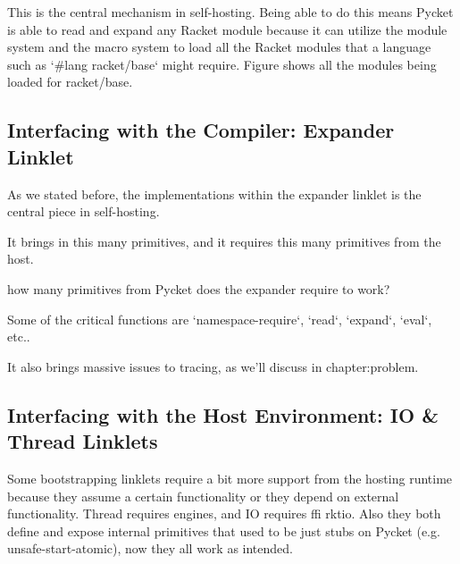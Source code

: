 
		\begin{paragraph-here}%
			This is the central mechanism in self-hosting. Being able to do this means Pycket is able to read and expand any Racket module because it can utilize the module system and the macro system to load all the Racket modules that a language such as `\#lang racket/base` might require. Figure shows all the modules being loaded for racket/base.
		\end{paragraph-here}

		\subsection{Interfacing with the Compiler: Expander Linklet}

			\begin{paragraph-here}%
				As we stated before, the implementations within the expander linklet is the central piece in self-hosting.
			\end{paragraph-here}

			\begin{paragraph-here}%
				It brings in this many primitives, and it requires this many primitives from the host.
			\end{paragraph-here}

			\begin{todo}
				how many primitives from Pycket does the expander require to work?
			\end{todo}

			\begin{paragraph-here}%
				Some of the critical functions are `namespace-require`, `read`, `expand`, `eval`, etc..
			\end{paragraph-here}

			\begin{paragraph-here}%
				It also brings massive issues to tracing, as we'll discuss in chapter:problem.
			\end{paragraph-here}

		\subsection{Interfacing with the Host Environment: IO \& Thread Linklets}

			\begin{paragraph-here}%
				Some bootstrapping linklets require a bit more support from the hosting runtime because they assume a certain functionality or they depend on external functionality. Thread requires engines, and IO requires ffi rktio. Also they both define and expose internal primitives that used to be just stubs on Pycket (e.g. unsafe-start-atomic), now they all work as intended.
			\end{paragraph-here}

